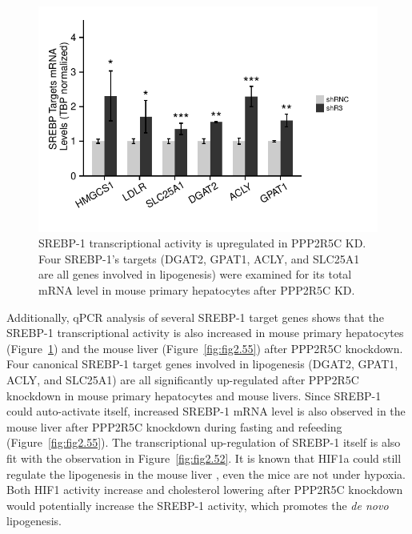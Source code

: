 \begin{figure}[!t]
\centering
\includegraphics[width=1\textwidth]{figs/fig2-54 srebp 1st hepa.pdf}
\caption[SREBP-1 activity increases upon PPP2R5C KD in primary hepatocytes]{\footnotesize SREBP-1 transcriptional activity is upregulated in PPP2R5C KD. Four SREBP-1's targets (DGAT2, GPAT1, ACLY, and SLC25A1 are all genes involved in lipogenesis) were examined for its total mRNA level in mouse primary hepatocytes after PPP2R5C KD.}
\label{fig:fig2.54}
\end{figure}

Additionally, qPCR analysis of several SREBP-1 target genes shows that the SREBP-1 transcriptional activity is also increased in mouse primary hepatocytes (Figure~\ref{fig:fig2.54}) and the mouse liver (Figure~\ref{fig:fig2.55}) after PPP2R5C knockdown. Four canonical SREBP-1 target genes involved in lipogenesis (\gls{DGAT2}, \gls{GPAT1}, \gls{ACLY}, and \gls{SLC25A1}) are all significantly up-regulated after PPP2R5C knockdown in mouse primary hepatocytes and mouse livers. Since SREBP-1 could auto-activate itself, increased SREBP-1 mRNA level is also observed in the mouse liver after PPP2R5C knockdown during fasting and refeeding (Figure~\ref{fig:fig2.55}). The transcriptional up-regulation of SREBP-1 itself is also fit with the observation in Figure~\ref{fig:fig2.52}. It is known that \gls{HIF1a} could still regulate the lipogenesis in the mouse liver \cite{wang_ablation_2009}, even the mice are not under hypoxia. Both HIF1\textalpha{} activity increase and cholesterol lowering after PPP2R5C knockdown would potentially increase the SREBP-1 activity, which promotes the \textit{de novo} lipogenesis. 

